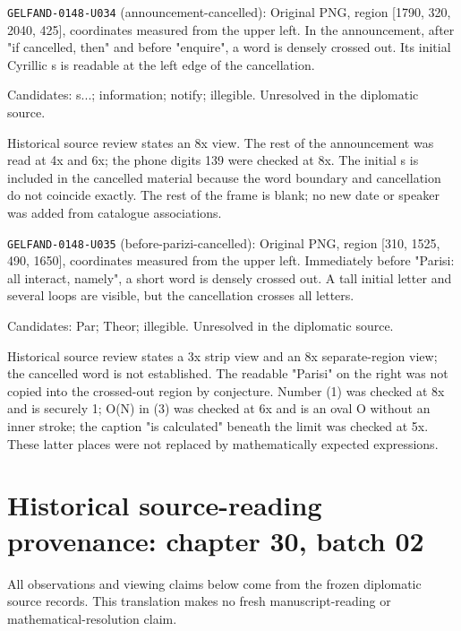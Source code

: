 \noindent\texttt{GELFAND-0148-U034} (announcement-cancelled): Original PNG, region [1790, 320, 2040, 425], coordinates measured from the upper left. In the announcement, after "if cancelled, then" and before "enquire", a word is densely crossed out. Its initial Cyrillic s is readable at the left edge of the cancellation.\par
Candidates: s...; information; notify; illegible. Unresolved in the diplomatic source.\par
Historical source review states an 8x view. The rest of the announcement was read at 4x and 6x; the phone digits 139 were checked at 8x. The initial s is included in the cancelled material because the word boundary and cancellation do not coincide exactly. The rest of the frame is blank; no new date or speaker was added from catalogue associations.\par

\noindent\texttt{GELFAND-0148-U035} (before-parizi-cancelled): Original PNG, region [310, 1525, 490, 1650], coordinates measured from the upper left. Immediately before "Parisi: all interact, namely", a short word is densely crossed out. A tall initial letter and several loops are visible, but the cancellation crosses all letters.\par
Candidates: Par; Theor; illegible. Unresolved in the diplomatic source.\par
Historical source review states a 3x strip view and an 8x separate-region view; the cancelled word is not established. The readable "Parisi" on the right was not copied into the crossed-out region by conjecture. Number (1) was checked at 8x and is securely 1; O(N) in (3) was checked at 6x and is an oval O without an inner stroke; the caption "is calculated" beneath the limit was checked at 5x. These latter places were not replaced by mathematically expected expressions.\par


\section*{Historical source-reading provenance: chapter 30, batch 02}
All observations and viewing claims below come from the frozen diplomatic source records. This translation makes no fresh manuscript-reading or mathematical-resolution claim.


